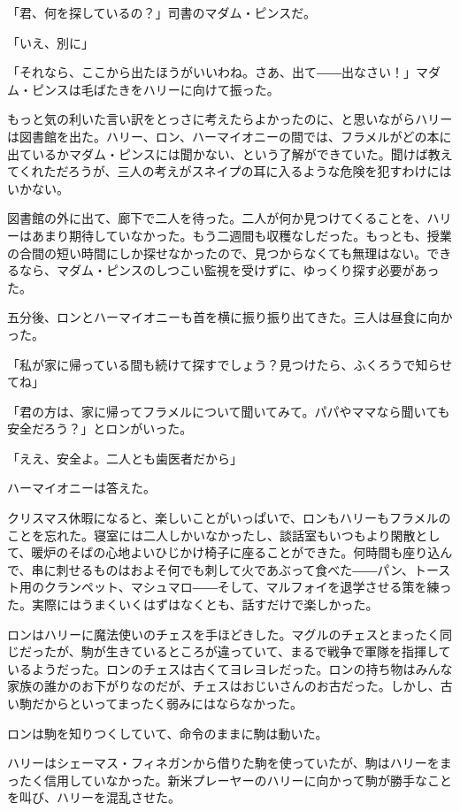 \documentclass[10pt,a4paper]{article}
\begin{document}
\begin{CJK}{UTF8}{min}
「君、何を探しているの？」司書のマダム・ピンスだ。

「いえ、別に」

「それなら、ここから出たほうがいいわね。さあ、出て――出なさい！」マダム・ピンスは毛ばたきをハリーに向けて振った。

もっと気の利いた言い訳をとっさに考えたらよかったのに、と思いながらハリーは図書館を出た。ハリー、ロン、ハーマイオニーの間では、フラメルがどの本に出ているかマダム・ピンスには聞かない、という了解ができていた。聞けば教えてくれただろうが、三人の考えがスネイプの耳に入るような危険を犯すわけにはいかない。

図書館の外に出て、廊下で二人を待った。二人が何か見つけてくることを、ハリーはあまり期待していなかった。もう二週間も収穫なしだった。もっとも、授業の合間の短い時間にしか探せなかったので、見つからなくても無理はない。できるなら、マダム・ピンスのしつこい監視を受けずに、ゆっくり探す必要があった。

五分後、ロンとハーマイオニーも首を横に振り振り出てきた。三人は昼食に向かった。

「私が家に帰っている間も続けて探すでしょう？見つけたら、ふくろうで知らせてね」

「君の方は、家に帰ってフラメルについて聞いてみて。パパやママなら聞いても安全だろう？」とロンがいった。

「ええ、安全よ。二人とも歯医者だから」

ハーマイオニーは答えた。



クリスマス休暇になると、楽しいことがいっぱいで、ロンもハリーもフラメルのことを忘れた。寝室には二人しかいなかったし、談話室もいつもより閑散として、暖炉のそばの心地よいひじかけ椅子に座ることができた。何時間も座り込んで、串に刺せるものはおよそ何でも刺して火であぶって食べた――パン、トースト用のクランペット、マシュマロ――そして、マルフォイを退学させる策を練った。実際にはうまくいくはずはなくとも、話すだけで楽しかった。

ロンはハリーに魔法使いのチェスを手ほどきした。マグルのチェスとまったく同じだったが、駒が生きているところが違っていて、まるで戦争で軍隊を指揮しているようだった。ロンのチェスは古くてヨレヨレだった。ロンの持ち物はみんな家族の誰かのお下がりなのだが、チェスはおじいさんのお古だった。しかし、古い駒だからといってまったく弱みにはならなかった。

ロンは駒を知りつくしていて、命令のままに駒は動いた。

ハリーはシェーマス・フィネガンから借りた駒を使っていたが、駒はハリーをまったく信用していなかった。新米プレーヤーのハリーに向かって駒が勝手なことを叫び、ハリーを混乱させた。


\end{CJK}
\end{document}
